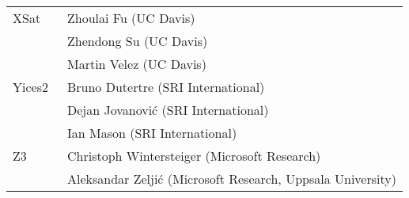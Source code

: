 {\begin{table}
\begin{tabular}{ll}

      XSat~\cite{DBLP:conf/cav/FuS16}
      & Zhoulai Fu (UC Davis) \\
      & Zhendong Su (UC Davis) \\
      & Martin Velez (UC Davis)
      \\ \midrule

      Yices2~\cite{Dutertre:cav2014}
      & Bruno Dutertre (SRI International) \\
      & Dejan Jovanovi\'c (SRI International) \\
      & Ian Mason (SRI International)
      \\ \midrule

      Z3~\cite{DBLP:conf/tacas/MouraB08}
      & Christoph Wintersteiger (Microsoft Research) \\
      & Aleksandar Zelji\'c (Microsoft Research, Uppsala University)
      \\
      \bottomrule
    \end{tabular}
  \end{table}
}

